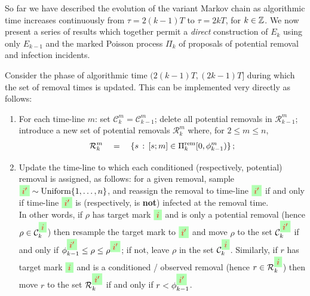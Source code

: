\documentclass[]{article}
\newcommand{\Conditioned}{\mathcal{C}}
\newcommand{\Epidemic}{E}%
\newcommand{\Removals}{\mathcal{R}}
\newcommand{\Poisson}{\Pi}
\newcommand{\PoissonRem}{\Poisson^\textup{rem}}
\newcommand{\target}{{\colorbox{green!30}{$\textcolor{red}{i}$}}}
\newcommand{\targetm}{{\colorbox{green!30}{$\textcolor{red}{i'}$}}}
\begin{document}
So far we have described the evolution of the variant Markov chain 
as algorithmic time increases continuously from \(\tau=2(k{-}1)T\) to \(\tau = 2kT\), for \(k\in\mathbb{Z}\). 
We now present a series of results which together permit a \emph{direct} 
construction of \(\Epidemic_k\) using only \(\Epidemic_{k-1}\) 
and the marked Poisson process \(\Poisson_k\) of proposals of potential removal and infection incidents.


\begin{lem}\label{lem:removal1}
Consider the phase of algorithmic time  \((2(k{-}1)T, (2k{-}1)T]\) during
which the set of removal times is updated.
This can be implemented very directly as follows:%
\text{ }%
\begin{enumerate}
\item\label{item:removals-v2} For each time-line \(m\): set \(\Conditioned^m_k = \Conditioned^m_{k-1}\);
delete all potential removals in \(\Removals^m_{k-1}\); 
introduce a new set of potential removals \(\Removals^m_k\) where, for \(2\le m\le n\),
\[
	\Removals^m_k \quad=\quad \{s\,:\,[s;m] \in \PoissonRem_k[0,\phi^m_{k-1}) \} \,;
\]
\item\label{item:re-mark-removals-v2}
Update the time-line to which each conditioned (respectively, potential) removal is assigned, as follows:
for a given removal, sample \(\targetm\sim \textrm{Uniform}\{1,\dots,n\}\), 
and reassign the removal to time-line \(\targetm\) 
if and only if time-line \(\targetm\) is (respectively, is \textbf{not}) infected at the removal time. 
\\
In other words, if 
\(\rho\) has target mark \(\target\) and is only a potential removal (hence
\(\rho\in\Conditioned^\target_k\)) 
then resample the target mark to \(\targetm\) and
move \(\rho\) to the set \(\Conditioned^{\targetm}_k\)
if and only if \(\phi^{\targetm}_{k-1} \le \rho \le \rho^{\targetm}\); 
if not, leave \(\rho\) in the set \(\Conditioned^\target_k\). 
Similarly, if \(r\)  has target mark \(\target\) and is a conditioned / observed removal
(hence \(r\in \Removals^\target_k\)) then move \(r\) to the set \(\Removals^{\targetm}_k\) 
if and only if \(r< \phi^{\targetm}_{k-1}\).%
\end{enumerate}
\end{lem}
\end{document}
